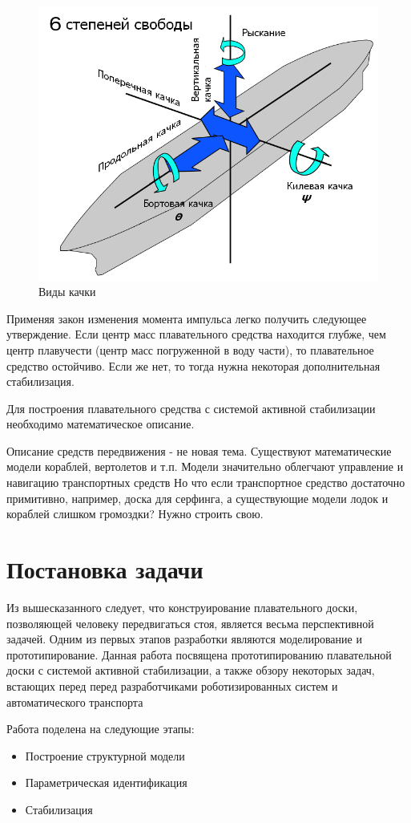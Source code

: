 \documentclass[12pt,a4paper]{article}
\begin{document}
\begin{figure}[h]
	\centering \includegraphics[width=0.4\linewidth]{images/kachka.png}
	\caption{Виды качки}
	\label{fig:kachka}
\end{figure}
Применяя закон изменения момента импульса легко получить следующее утверждение. Если центр масс плавательного средства находится глубже, чем центр плавучести (центр масс погруженной в воду части), то плавательное средство остойчиво. Если же нет, то тогда нужна некоторая дополнительная стабилизация.

Для построения плавательного средства с системой активной стабилизации необходимо математическое описание.

Описание средств передвижения - не новая тема. Существуют математические модели кораблей, вертолетов и т.п. Модели значительно облегчают управление и навигацию транспортных средств Но что если транспортное средство достаточно примитивно, например, доска для серфинга, а существующие модели лодок и кораблей слишком громоздки? Нужно строить свою.


\section{Постановка задачи}

Из вышесказанного следует, что конструирование плавательного доски, позволяющей человеку передвигаться стоя, является весьма перспективной задачей. Одним из первых этапов разработки являются моделирование и прототипирование. Данная работа посвящена прототипированию плавательной доски с системой активной стабилизации, а также обзору некоторых задач, встающих перед перед разработчиками роботизированных систем и автоматического транспорта

Работа поделена на следующие этапы:

\begin{itemize}
	\item Построение структурной модели
	\item Параметрическая идентификация
	\item Стабилизация
\end{itemize}
\end{document}
